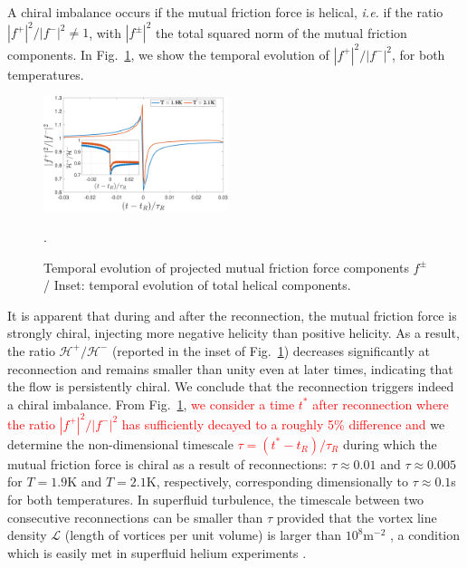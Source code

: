 \documentclass[%
 reprint,
 amsmath,amssymb,
 aps,
 prl,
]{revtex4-2}
\def\red#1{\textcolor{red}{#1}}
\begin{document}
{A chiral imbalance occurs if the mutual friction force is helical, 
\textit{i.e.} if the ratio $|f^+|^2/|f^-|^2 \neq 1$, with $|f^\pm|^2$ the total squared norm of the mutual friction components. 
In Fig.~\ref{fig:mutual-friction-decomp}, we show the temporal evolution of $|f^+|^2/|f^-|^2$, for both temperatures. 
%
\begin{figure}[h!]
    \centering
    \includegraphics*[width=0.48\textwidth]{fmfDecompFig.pdf}
    \caption{Temporal evolution of projected mutual friction force components $f^\pm$/ Inset: temporal evolution of total helical components.}.
    \label{fig:mutual-friction-decomp}
\end{figure}
%
It is apparent
that during and after the reconnection, the mutual friction force is strongly chiral,
injecting more negative helicity than positive helicity. 
As a result, the ratio $\mathcal{H}^+/\mathcal{H}^-$ 
(reported in the inset of Fig.~\ref{fig:mutual-friction-decomp}) 
decreases significantly at reconnection and remains smaller than unity even at later times, 
indicating that the flow is persistently chiral. We conclude that the reconnection triggers indeed a chiral imbalance.
From Fig.~\ref{fig:mutual-friction-decomp}, \red{ we consider a time $t^*$ after reconnection where the ratio $|f^+|^2/|f^-|^2$ has sufficiently decayed to a roughly 5\% difference and} we determine the non-dimensional timescale \red{$\tau = (t^*-t_R)/\tau_R$} during which the mutual friction force is chiral as a result of reconnections: $\tau \approx 0.01$ and $\tau \approx 0.005$
for $T=1.9$K and $T=2.1$K, respectively, corresponding dimensionally to $\tau \approx 0.1$s for both temperatures. 
In superfluid turbulence, the timescale between two consecutive reconnections can be smaller than $\tau$ provided that the
vortex line density $\mathcal{L}$ (length of vortices per unit volume) is larger than $10^8 \text{m}^{-2}$ \cite{stasiak2024quantum,barenghi2004},
a condition which is easily met in superfluid helium experiments \cite{roche2007,Babuin2014}.




}
\end{document}
